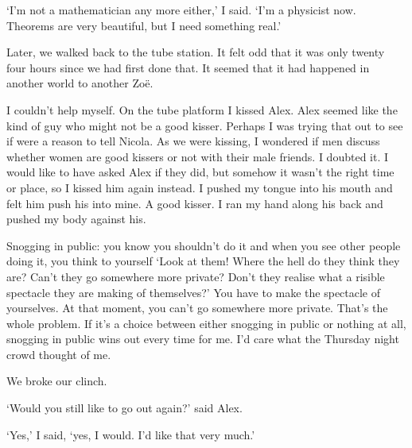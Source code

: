 `I'm not a mathematician any more either,' I said. `I'm a physicist now.
Theorems are very beautiful, but I need something real.'

Later, we walked back to the tube station. It felt odd that it was
only twenty four hours since we had first done that. It seemed that
it had happened in another world to another Zo{\"e}.

I couldn't help myself. On the tube platform I kissed Alex. Alex seemed like the kind of guy
who might not be a good kisser. Perhaps I was trying that out to see if were a reason to tell Nicola. As we were kissing, I wondered if men discuss whether
women are good kissers or not with their male friends. I doubted it.
I would like to have asked Alex if they did, but somehow it wasn't
the right time or place, so I kissed him again instead. I pushed my
tongue into his mouth and felt him push his into mine. A good
kisser. I ran my hand along his back and pushed my body against his.

Snogging in public: you know you shouldn't do it and when you see
other people doing it, you think to yourself `Look at them! Where
the hell do they think they are? Can't they go somewhere more
private? Don't they realise what a risible spectacle they are making
of themselves?' You have to make the spectacle of yourselves. At
that moment, you can't go somewhere more private. That's the whole
problem. If it's a choice between either snogging in public or
nothing at all, snogging in public wins out every time for me. I'd
care what the Thursday night crowd thought of me.

We broke our clinch.

`Would you still like to go out again?' said Alex.

`Yes,' I said, `yes, I would. I'd like that very much.'
\vfill\eject
